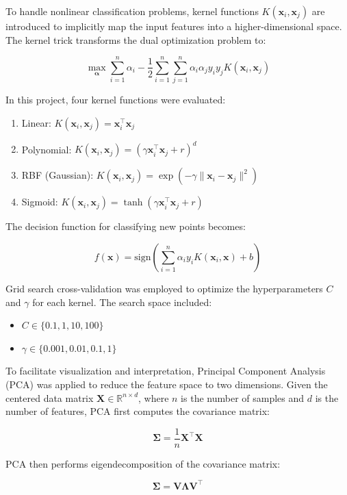 \documentclass{article}
\begin{document}
To handle nonlinear classification problems, kernel functions $K(\mathbf{x}_i, \mathbf{x}_j)$ are introduced to implicitly map the input features into a higher-dimensional space. The kernel trick transforms the dual optimization problem to:

\[
\max_{\boldsymbol{\alpha}} \sum_{i=1}^n \alpha_i - \frac{1}{2}\sum_{i=1}^n\sum_{j=1}^n \alpha_i\alpha_j y_i y_j K(\mathbf{x}_i, \mathbf{x}_j)
\]

In this project, four kernel functions were evaluated:
\begin{enumerate}
    \item Linear: $K(\mathbf{x}_i, \mathbf{x}_j) = \mathbf{x}_i^\top\mathbf{x}_j$
    \item Polynomial: $K(\mathbf{x}_i, \mathbf{x}_j) = (\gamma\mathbf{x}_i^\top\mathbf{x}_j + r)^d$
    \item RBF (Gaussian): $K(\mathbf{x}_i, \mathbf{x}_j) = \exp(-\gamma\|\mathbf{x}_i - \mathbf{x}_j\|^2)$
    \item Sigmoid: $K(\mathbf{x}_i, \mathbf{x}_j) = \tanh(\gamma\mathbf{x}_i^\top\mathbf{x}_j + r)$
\end{enumerate}

The decision function for classifying new points becomes:

\[
f(\mathbf{x}) = \text{sign}\left(\sum_{i=1}^n \alpha_i y_i K(\mathbf{x}_i, \mathbf{x}) + b\right)
\]

Grid search cross-validation was employed to optimize the hyperparameters $C$ and $\gamma$ for each kernel. The search space included:
\begin{itemize}
    \item $C \in \{0.1, 1, 10, 100\}$
    \item $\gamma \in \{0.001, 0.01, 0.1, 1\}$
\end{itemize}

To facilitate visualization and interpretation, Principal Component Analysis (PCA) was applied to reduce the feature space to two dimensions. Given the centered data matrix $\mathbf{X} \in \mathbb{R}^{n \times d}$, where $n$ is the number of samples and $d$ is the number of features, PCA first computes the covariance matrix:

\[
\mathbf{\Sigma} = \frac{1}{n}\mathbf{X}^\top\mathbf{X}
\]

PCA then performs eigendecomposition of the covariance matrix:

\[
\mathbf{\Sigma} = \mathbf{V}\boldsymbol{\Lambda}\mathbf{V}^\top
\]
\end{document}
